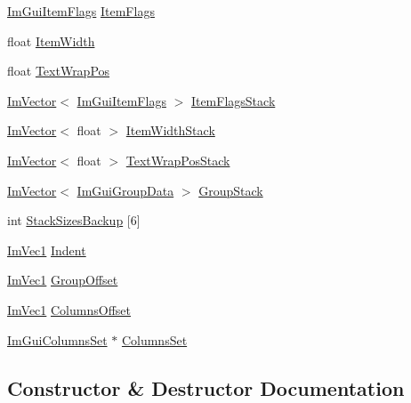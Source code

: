 \begin{DoxyCompactItemize}
\item 
\mbox{\hyperlink{imgui__internal_8h_abcf9eafab4557e911b2c0d8fe2feeb38}{Im\+Gui\+Item\+Flags}} \mbox{\hyperlink{struct_im_gui_window_temp_data_a58af415d3d3fc3e5d6925884a35c17f1}{Item\+Flags}}
\item 
float \mbox{\hyperlink{struct_im_gui_window_temp_data_abc1312710a2091709415d425d2ffc971}{Item\+Width}}
\item 
float \mbox{\hyperlink{struct_im_gui_window_temp_data_a4f9366e24dce97f0cc3ecc0e19436db5}{Text\+Wrap\+Pos}}
\item 
\mbox{\hyperlink{class_im_vector}{Im\+Vector}}$<$ \mbox{\hyperlink{imgui__internal_8h_abcf9eafab4557e911b2c0d8fe2feeb38}{Im\+Gui\+Item\+Flags}} $>$ \mbox{\hyperlink{struct_im_gui_window_temp_data_ab3df41f54a3de26b5b53b92973e4fc93}{Item\+Flags\+Stack}}
\item 
\mbox{\hyperlink{class_im_vector}{Im\+Vector}}$<$ float $>$ \mbox{\hyperlink{struct_im_gui_window_temp_data_ac3be9bc08a4ab80a67c6ebc48f4e578a}{Item\+Width\+Stack}}
\item 
\mbox{\hyperlink{class_im_vector}{Im\+Vector}}$<$ float $>$ \mbox{\hyperlink{struct_im_gui_window_temp_data_aa65230cd1350ef584984919a7fa4c92b}{Text\+Wrap\+Pos\+Stack}}
\item 
\mbox{\hyperlink{class_im_vector}{Im\+Vector}}$<$ \mbox{\hyperlink{struct_im_gui_group_data}{Im\+Gui\+Group\+Data}} $>$ \mbox{\hyperlink{struct_im_gui_window_temp_data_ab25fa1835e4cabf3edc642ab67f4ed8b}{Group\+Stack}}
\item 
int \mbox{\hyperlink{struct_im_gui_window_temp_data_aa0d6316f7bbf8814bcdda896dcc14186}{Stack\+Sizes\+Backup}} \mbox{[}6\mbox{]}
\item 
\mbox{\hyperlink{struct_im_vec1}{Im\+Vec1}} \mbox{\hyperlink{struct_im_gui_window_temp_data_a1ed2e037a987c8fc7ecdc4f5888657b5}{Indent}}
\item 
\mbox{\hyperlink{struct_im_vec1}{Im\+Vec1}} \mbox{\hyperlink{struct_im_gui_window_temp_data_a29dbe26f59a7a8b667cc21a3ea3332a9}{Group\+Offset}}
\item 
\mbox{\hyperlink{struct_im_vec1}{Im\+Vec1}} \mbox{\hyperlink{struct_im_gui_window_temp_data_af86ba9662f7aeb95c49e785d941f4c69}{Columns\+Offset}}
\item 
\mbox{\hyperlink{struct_im_gui_columns_set}{Im\+Gui\+Columns\+Set}} $\ast$ \mbox{\hyperlink{struct_im_gui_window_temp_data_ad9f706accb8e746de27494cf8f3e1b39}{Columns\+Set}}
\end{DoxyCompactItemize}


\subsection{Constructor \& Destructor Documentation}
\mbox{\label{struct_im_gui_window_temp_data_a38a3703e2a34a04f7df748ce7085bc2e}} 

